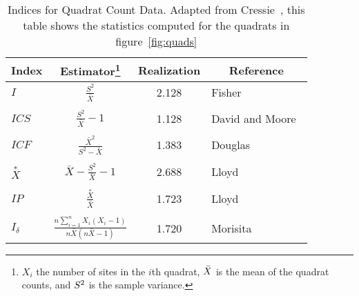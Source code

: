 \begin{table}[h]
\begin{center}
\begin{minipage}{.8\textwidth}
\caption{Indices for Quadrat Count Data.  Adapted from
Cressie~\protect\cite{cressie91}, this table shows the
statistics computed for the quadrats in figure~\protect\ref{fig:quads}}
\label{tbl:indices}
\begin{center}
\begin{tabular}{lccl}\hline
Index & Estimator\protect\footnote{$X_i$ the
number of sites in the $i$th quadrat, $\bar{X}\/$ is the mean of the
quadrat counts, and $S^2\/$ is the sample variance.}
 & Realization & \multicolumn{1}{c}{Reference}\\ \hline
$I$ & $\frac{S^2}{\bar{X}}$ & 2.128 & Fisher~\cite{fisher22} \\ \\
$ICS$ & $\frac{S^2}{\bar{X}}-1$ & 1.128& David and Moore~\cite{david54}\\ \\
$ICF$ & $\frac{\bar{X}^2}{S^2-\bar{X}}$ & 1.383& Douglas~\cite{douglas75}\\ \\
$\stackrel{*}{X}$ & $\bar{X}-\frac{S^2}{\bar{X}}-1$
				& 2.688& Lloyd~\cite{lloyd67}\\ \\
$IP$ & $\frac{\stackrel{*}{X}}{\bar{X}}$ 
				& 1.723 & Lloyd~\cite{lloyd67}\\ \\
$I_\delta$ & 
$\frac{n\sum_{i=1}^n X_i\left(X_i-1\right)}{n\bar{X} \left(n\bar{X}-1\right)}$ 
& 1.720 & Morisita~\cite{morisita59}\\ \hline
\end{tabular}
\end{center}
\end{minipage}
\end{center}
\end{table}

\clearpage



